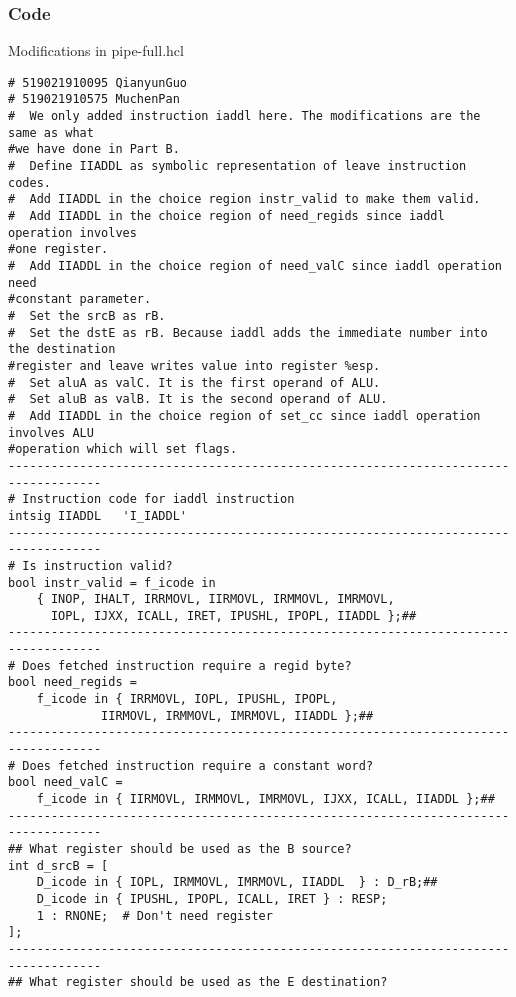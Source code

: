 \documentclass{article}
\begin{document}
\subsubsection{Code}

\begin{center}
Modifications in {\ttfamily pipe-full.hcl}
\end{center}
\begin{lstlisting}[language={[x86masm]Assembler}]
# 519021910095 QianyunGuo
# 519021910575 MuchenPan
#  We only added instruction iaddl here. The modifications are the same as what 
#we have done in Part B.
#  Define IIADDL as symbolic representation of leave instruction codes.
#  Add IIADDL in the choice region instr_valid to make them valid.
#  Add IIADDL in the choice region of need_regids since iaddl operation involves
#one register. 
#  Add IIADDL in the choice region of need_valC since iaddl operation need 
#constant parameter. 
#  Set the srcB as rB. 
#  Set the dstE as rB. Because iaddl adds the immediate number into the destination
#register and leave writes value into register %esp.
#  Set aluA as valC. It is the first operand of ALU.
#  Set aluB as valB. It is the second operand of ALU.
#  Add IIADDL in the choice region of set_cc since iaddl operation involves ALU 
#operation which will set flags.
-----------------------------------------------------------------------------------
# Instruction code for iaddl instruction
intsig IIADDL	'I_IADDL'
-----------------------------------------------------------------------------------
# Is instruction valid?
bool instr_valid = f_icode in 
	{ INOP, IHALT, IRRMOVL, IIRMOVL, IRMMOVL, IMRMOVL,
	  IOPL, IJXX, ICALL, IRET, IPUSHL, IPOPL, IIADDL };##
-----------------------------------------------------------------------------------
# Does fetched instruction require a regid byte?
bool need_regids =
	f_icode in { IRRMOVL, IOPL, IPUSHL, IPOPL, 
		     IIRMOVL, IRMMOVL, IMRMOVL, IIADDL };##
-----------------------------------------------------------------------------------
# Does fetched instruction require a constant word?
bool need_valC =
	f_icode in { IIRMOVL, IRMMOVL, IMRMOVL, IJXX, ICALL, IIADDL };##
-----------------------------------------------------------------------------------
## What register should be used as the B source?
int d_srcB = [
	D_icode in { IOPL, IRMMOVL, IMRMOVL, IIADDL  } : D_rB;##
	D_icode in { IPUSHL, IPOPL, ICALL, IRET } : RESP;
	1 : RNONE;  # Don't need register
];
-----------------------------------------------------------------------------------
## What register should be used as the E destination?

\end{lstlisting}
\end{document}
